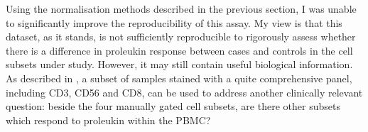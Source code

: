 %

Using the normalisation methods described in the previous section, I was unable to significantly improve the reproducibility of this assay.
My view is that this dataset, as it stands, is not sufficiently reproducible to rigorously assess whether there is a difference in proleukin response between cases and controls in the cell subsets under study.
However, it may still contain useful biological information.
As described in , a subset of samples stained with a quite comprehensive panel, including CD3, CD56 and CD8, can be used to address another clinically relevant question:
beside the four manually gated cell subsets, are there other subsets which respond to proleukin within the \gls{PBMC}?

